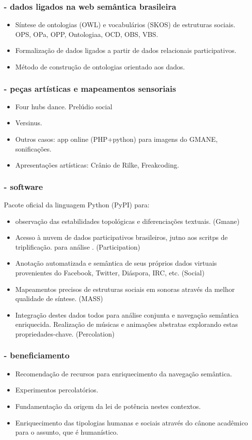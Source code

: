 \documentclass[10pt]{beamer}
\begin{document}
\begin{frame}
\frametitle{- dados ligados na web semântica brasileira}
\begin{itemize}
	\item Síntese de ontologias (OWL) e vocabulários (SKOS) de estruturas sociais. OPS, OPa, OPP, Ontologiaa, OCD, OBS, VBS.
	\item Formalização de dados ligados a partir de dados relacionais participativos.
	\item Método de construção de ontologias orientado aos dados.
\end{itemize}
\end{frame}

\begin{frame}
\frametitle{- peças artísticas e mapeamentos sensoriais}
\begin{itemize}
	\item Four hubs dance. Prelúdio social
	\item Versinus.
	\item Outros casos: app online (PHP+python) para imagens do GMANE, sonificações.
	\item Apresentações artísticas: Crânio de Rilke, Freakcoding.
\end{itemize}
\end{frame}

\begin{frame}
\frametitle{- software}
Pacote oficial da linguagem Python (PyPI) para:
	\begin{itemize}
		\item observação das estabilidades topológicas e diferenciações textuais. (Gmane)
		\item Acesso à nuvem de dados participativos brasileiros, jutno aos scritps de triplificação. para análise . (Participation)
		\item Anotação automatizada e semântica de seus próprios dados virtuais provenientes do Facebook, Twitter, Diáspora, IRC, etc. (Social)
		\item Mapeamentos precisos de estruturas sociais em sonoras através da melhor qualidade de síntese. (MASS)
		\item Integração destes dados todos para análise conjunta e navegação semântica enriquecida. Realização de músicas e animações abstratas explorando estas propriedades-chave. (Percolation)
	\end{itemize}
\end{frame}

\begin{frame}
\frametitle{- beneficiamento}
\begin{itemize}
	\item Recomendação de recursos para enriquecimento da navegação semântica.
	\item Experimentos percolatórios.
	\item Fundamentação da origem da lei de potência nestes contextos.
	\item Enriquecimento das tipologias humanas e sociais através do cânone acadêmico para o assunto, que é humanístico.
\end{itemize}
\end{frame}
\end{document}
